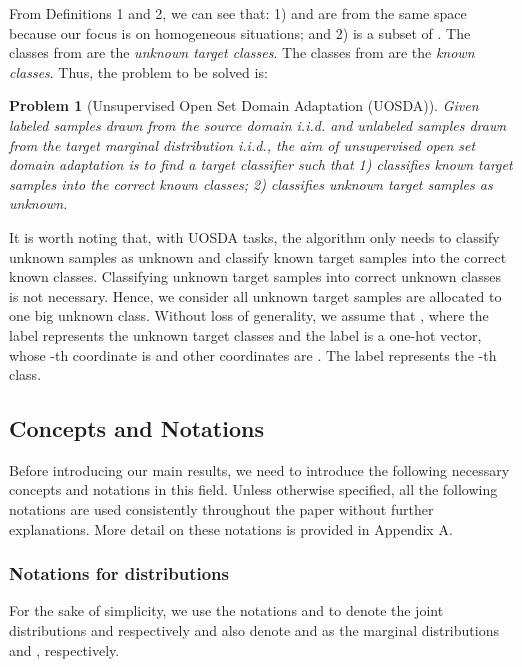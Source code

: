\documentclass[journal]{IEEEtran}
\newtheorem{definition*}{Problem}
\begin{document}
From Definitions 1 and 2, we can see that: 1)  and  are from the same space because our focus is on homogeneous situations; and 2)  is a subset of . The classes from  are the \textit{{unknown target classes}}.  The classes from  are the \textit{{known classes}}. Thus, the problem to be solved is:

\begin{definition*}[{Unsupervised Open Set Domain Adaptation (UOSDA)}]
Given labeled samples  drawn from the source domain  i.i.d. and unlabeled samples  drawn from the target marginal distribution  i.i.d., {the aim of unsupervised open set domain adaptation} is to find a target classifier   such that
\newline
\noindent\textit{1)}  \textit{classifies known target samples into the correct known classes;}\newline
\noindent\textit{2)}  \textit{classifies unknown target samples as unknown.
}
\end{definition*}

It is worth noting that, with UOSDA tasks, the algorithm only needs to classify unknown samples as unknown and classify known target samples into the correct known classes. Classifying unknown target samples into correct unknown classes is not necessary. Hence, we consider all unknown target samples are allocated to one big unknown class.  {Without loss of generality, we assume that
 , where the label  represents the unknown target classes and the label  is a one-hot vector, whose -th coordinate is  and other coordinates are . The label  represents the -th class.}




  




\subsection{{Concepts and Notations}}
\vspace{-0.1cm}
Before introducing our main results, we need to introduce the following necessary concepts and notations in this field. 
Unless otherwise specified, all the following notations are used consistently throughout the paper without further explanations. More detail on these notations is provided in Appendix A.


\subsubsection{{Notations for distributions}} For the
sake of simplicity, we use the notations  and  to denote the joint distributions  and  respectively and also denote  and  as the marginal distributions  and , respectively. 
\end{document}
